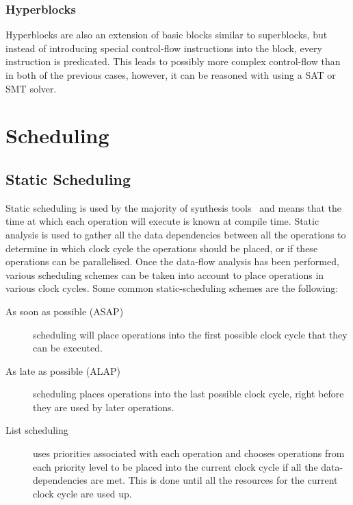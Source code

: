 \subsubsection{Hyperblocks}

Hyperblocks are also an extension of basic blocks similar to superblocks, but
instead of introducing special control-flow instructions into the block, every
instruction is predicated.  This leads to possibly more complex control-flow
than in both of the previous cases, however, it can be reasoned with using a
\gls{SAT} or \gls{SMT} solver.

\section{Scheduling}%
\label{sec:bg:scheduling}

\subsection{Static Scheduling}%
\label{sec:bg:static-scheduling}

Static scheduling is used by the majority of synthesis
tools~\cite{canis13_legup, xilinx20_vivad_high_synth,
  mentor20_catap_high_level_synth, intel20_sdk_openc_applic} and means that the
time at which each operation will execute is known at compile time.  Static
analysis is used to gather all the data dependencies between all the operations
to determine in which clock cycle the operations should be placed, or if these
operations can be parallelised.  Once the data-flow analysis has been performed,
various scheduling schemes can be taken into account to place operations in
various clock cycles.  Some common static-scheduling schemes are the following:

\begin{description}
\item[As soon as possible (ASAP)] scheduling will place operations into
  the first possible clock cycle that they can be executed.

\item[As late as possible (ALAP)] scheduling places operations into the last
  possible clock cycle, right before they are used by later operations.

\item[List scheduling] uses priorities associated with each operation and
  chooses operations from each priority level to be placed into the current
  clock cycle if all the data-dependencies are met.  This is done until all the
  resources for the current clock cycle are used up.
\end{description}

